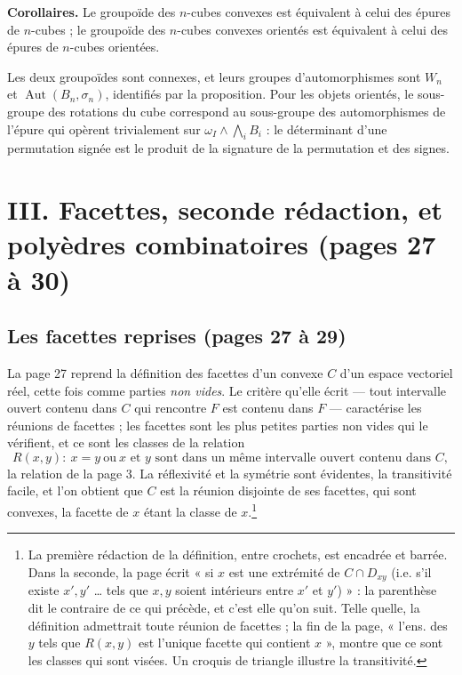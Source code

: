 \documentclass[11pt,a4paper]{article}
\begin{document}
\textbf{Corollaires.} Le groupoïde des $n$-cubes convexes est équivalent à
celui des épures de $n$-cubes ; le groupoïde des $n$-cubes convexes orientés est
équivalent à celui des épures de $n$-cubes orientées.

Les deux groupoïdes sont connexes, et leurs groupes d'automorphismes sont
$W_{n}$ et $\operatorname{Aut}(B_{n}, \sigma_{n})$, identifiés par la
proposition. Pour les objets orientés, le sous-groupe des rotations du cube
correspond au sous-groupe des automorphismes de l'épure qui opèrent
trivialement sur $\omega_{I} \wedge \bigwedge_{i} B_{i}$ : le déterminant d'une
permutation signée est le produit de la signature de la permutation et des
signes.

\section*{III. Facettes, seconde rédaction, et polyèdres combinatoires (pages 27 à 30)}

\subsection*{Les facettes reprises (pages 27 à 29)}

La page 27 reprend la définition des facettes d'un convexe $C$ d'un espace
vectoriel réel, cette fois comme parties \emph{non vides}. Le critère qu'elle
écrit --- tout intervalle ouvert contenu dans $C$ qui rencontre $F$ est contenu
dans $F$ --- caractérise les réunions de facettes ; les facettes sont les plus
petites parties non vides qui le vérifient, et ce sont les classes de la
relation
\[
  R(x,y) : \ x = y \ \text{ou} \ x \text{ et } y \text{ sont dans un même
  intervalle ouvert contenu dans } C,
\]
la relation de la page 3. La réflexivité et la symétrie sont évidentes, la
transitivité facile, et l'on obtient que $C$ est la réunion disjointe de ses
facettes, qui sont convexes, la facette de $x$ étant la classe de
$x$.\footnote{La première rédaction de la définition, entre crochets, est
encadrée et barrée. Dans la seconde, la page écrit « si $x$ est une extrémité de
$C \cap D_{xy}$ (i.e. s'il existe $x', y'$ \ldots{} tels que $x, y$ soient
intérieurs entre $x'$ et $y'$) » : la parenthèse dit le contraire de ce qui
précède, et c'est elle qu'on suit. Telle quelle, la définition admettrait
toute réunion de facettes ; la fin de la page, « l'ens. des $y$ tels que
$R(x,y)$ est l'unique facette qui contient $x$ », montre que ce sont les classes
qui sont visées. Un croquis de triangle illustre la transitivité.}
\end{document}
